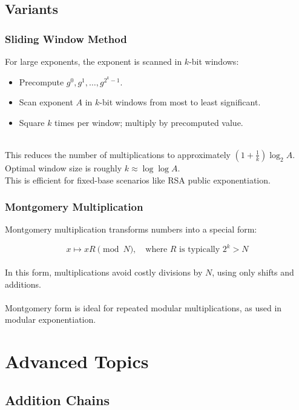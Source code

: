 \documentclass[12pt,openany]{book}
\theoremstyle{definition}
\theoremstyle{plain}
\theoremstyle{remark}
\begin{document}
\section{Variants}

\subsection{Sliding Window Method}

For large exponents, the exponent is scanned in $k$-bit windows:

\begin{itemize}
  \item Precompute $g^0, g^1, \dots, g^{2^k - 1}$.
  \item Scan exponent $A$ in $k$-bit windows from most to least significant.
  \item Square $k$ times per window; multiply by precomputed value.
\end{itemize}
\noindent
\\
This reduces the number of multiplications to approximately $(1 + \frac{1}{k}) \log_2 A$.
\noindent
\\
Optimal window size is roughly $k \approx \log \log A$.
\noindent
\\
This is efficient for fixed-base scenarios like RSA public exponentiation.

\subsection{Montgomery Multiplication}

Montgomery multiplication transforms numbers into a special form:

\[
x \mapsto xR \pmod{N}, \quad \text{where } R \text{ is typically } 2^k > N
\]
\noindent
\\
In this form, multiplications avoid costly divisions by $N$, using only shifts and additions.
\noindent
\\ \\
Montgomery form is ideal for repeated modular multiplications, as used in modular exponentiation.


\chapter{Advanced Topics}

\section{Addition Chains}
\end{document}
